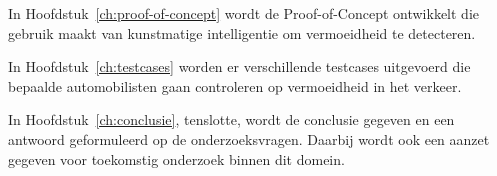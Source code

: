 In Hoofdstuk~\ref{ch:proof-of-concept} wordt de Proof-of-Concept ontwikkelt die gebruik maakt van kunstmatige intelligentie om vermoeidheid te detecteren.

In Hoofdstuk~\ref{ch:testcases} worden er verschillende testcases uitgevoerd die bepaalde automobilisten gaan controleren op vermoeidheid in het verkeer.

In Hoofdstuk~\ref{ch:conclusie}, tenslotte, wordt de conclusie gegeven en een antwoord geformuleerd op de onderzoeksvragen. Daarbij wordt ook een aanzet gegeven voor toekomstig onderzoek binnen dit domein.